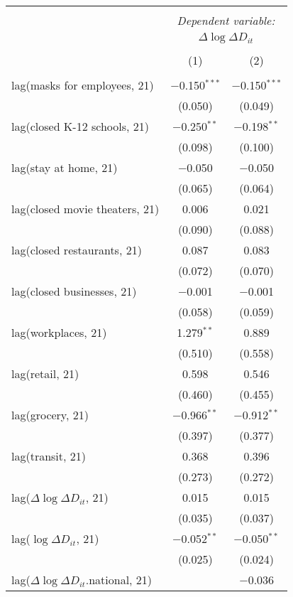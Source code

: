 \begin{tabular}{@{\extracolsep{1pt}}lcc} 
\\[-1.8ex]\hline 
\hline \\[-1.8ex] 
 & \multicolumn{2}{c}{\textit{Dependent variable:}} \\ 
\cline{2-3} 
 & \multicolumn{2}{c}{$\Delta \log \Delta D_{it}$} \\ 
\\[-1.8ex] & (1) & (2)\\ 
\hline \\[-1.8ex] 
 lag(masks for employees, 21) & $-$0.150$^{***}$ & $-$0.150$^{***}$ \\ 
  & (0.050) & (0.049) \\ 
  lag(closed K-12 schools, 21) & $-$0.250$^{**}$ & $-$0.198$^{**}$ \\ 
  & (0.098) & (0.100) \\ 
  lag(stay at home, 21) & $-$0.050 & $-$0.050 \\ 
  & (0.065) & (0.064) \\ 
  lag(closed movie theaters, 21) & 0.006 & 0.021 \\ 
  & (0.090) & (0.088) \\ 
  lag(closed restaurants, 21) & 0.087 & 0.083 \\ 
  & (0.072) & (0.070) \\ 
  lag(closed businesses, 21) & $-$0.001 & $-$0.001 \\ 
  & (0.058) & (0.059) \\ 
  lag(workplaces, 21) & 1.279$^{**}$ & 0.889 \\ 
  & (0.510) & (0.558) \\ 
  lag(retail, 21) & 0.598 & 0.546 \\ 
  & (0.460) & (0.455) \\ 
  lag(grocery, 21) & $-$0.966$^{**}$ & $-$0.912$^{**}$ \\ 
  & (0.397) & (0.377) \\ 
  lag(transit, 21) & 0.368 & 0.396 \\ 
  & (0.273) & (0.272) \\ 
  lag($\Delta \log \Delta D_{it}$, 21) & 0.015 & 0.015 \\ 
  & (0.035) & (0.037) \\ 
  lag($\log \Delta D_{it}$, 21) & $-$0.052$^{**}$ & $-$0.050$^{**}$ \\ 
  & (0.025) & (0.024) \\ 
  lag($\Delta \log \Delta D_{it}$.national, 21) &  & $-$0.036 \\ 

\end{tabular}
